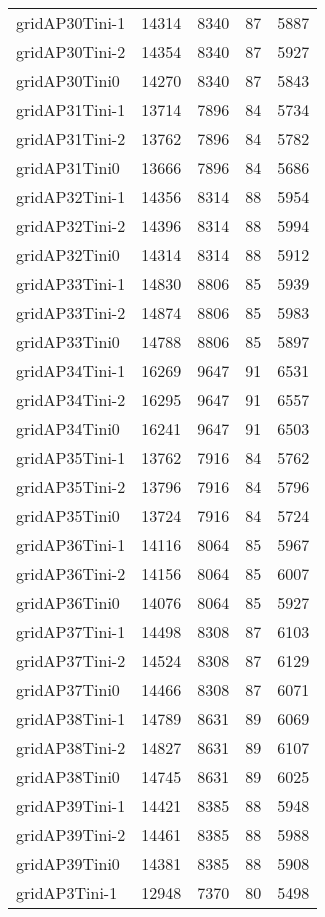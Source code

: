 \documentclass[../../../thesis.tex]{subfiles}
\begin{document}
\begin{longtable}{lrrrr}
gridAP30Tini-1 & 14314 & 8340 & 87 & 5887 \\
gridAP30Tini-2 & 14354 & 8340 & 87 & 5927 \\
gridAP30Tini0 & 14270 & 8340 & 87 & 5843 \\
gridAP31Tini-1 & 13714 & 7896 & 84 & 5734 \\
gridAP31Tini-2 & 13762 & 7896 & 84 & 5782 \\
gridAP31Tini0 & 13666 & 7896 & 84 & 5686 \\
gridAP32Tini-1 & 14356 & 8314 & 88 & 5954 \\
gridAP32Tini-2 & 14396 & 8314 & 88 & 5994 \\
gridAP32Tini0 & 14314 & 8314 & 88 & 5912 \\
gridAP33Tini-1 & 14830 & 8806 & 85 & 5939 \\
gridAP33Tini-2 & 14874 & 8806 & 85 & 5983 \\
gridAP33Tini0 & 14788 & 8806 & 85 & 5897 \\
gridAP34Tini-1 & 16269 & 9647 & 91 & 6531 \\
gridAP34Tini-2 & 16295 & 9647 & 91 & 6557 \\
gridAP34Tini0 & 16241 & 9647 & 91 & 6503 \\
gridAP35Tini-1 & 13762 & 7916 & 84 & 5762 \\
gridAP35Tini-2 & 13796 & 7916 & 84 & 5796 \\
gridAP35Tini0 & 13724 & 7916 & 84 & 5724 \\
gridAP36Tini-1 & 14116 & 8064 & 85 & 5967 \\
gridAP36Tini-2 & 14156 & 8064 & 85 & 6007 \\
gridAP36Tini0 & 14076 & 8064 & 85 & 5927 \\
gridAP37Tini-1 & 14498 & 8308 & 87 & 6103 \\
gridAP37Tini-2 & 14524 & 8308 & 87 & 6129 \\
gridAP37Tini0 & 14466 & 8308 & 87 & 6071 \\
gridAP38Tini-1 & 14789 & 8631 & 89 & 6069 \\
gridAP38Tini-2 & 14827 & 8631 & 89 & 6107 \\
gridAP38Tini0 & 14745 & 8631 & 89 & 6025 \\
gridAP39Tini-1 & 14421 & 8385 & 88 & 5948 \\
gridAP39Tini-2 & 14461 & 8385 & 88 & 5988 \\
gridAP39Tini0 & 14381 & 8385 & 88 & 5908 \\
gridAP3Tini-1 & 12948 & 7370 & 80 & 5498 \\

\end{longtable}
\end{document}
